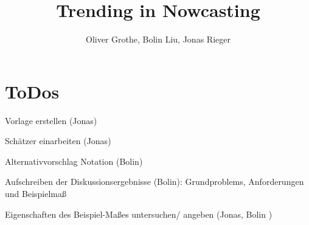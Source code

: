 \documentclass{article}
\title{Trending in Nowcasting}
\author{Oliver Grothe, Bolin Liu, Jonas Rieger}
\theoremstyle{plain}%
\theoremstyle{definition}
\newcommand{\cmark}{\ding{51}}%
\newcommand{\done}{\rlap{$\square$}{\raisebox{2pt}{\large\hspace{1pt}\cmark}}%
\hspace{-2.5pt}}
\begin{document}
\maketitle


\section{ToDos}


\begin{todolist}
\item[\done] Vorlage erstellen (Jonas)
\item[\done] Schätzer einarbeiten (Jonas)
\item[\done] Alternativvorschlag Notation (Bolin)
\item[\done] Aufschreiben der Diskussionsergebnisse (Bolin): Grundproblems, Anforderungen und Beispielmaß
\item Eigenschaften des Beispiel-Maßes untersuchen/ angeben (Jonas, Bolin ) 
\end{todolist}



\end{document}
